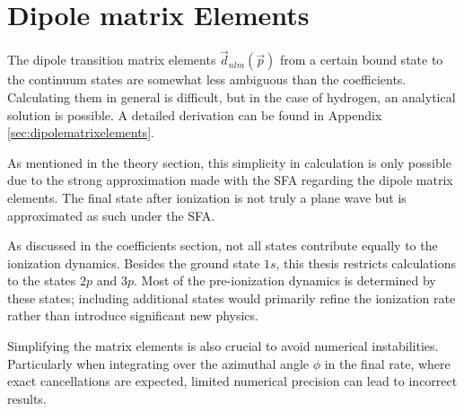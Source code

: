





\section{Dipole matrix Elements}
The dipole transition matrix elements $\vec{d}_{nlm}(\vec{p})$ from a certain bound state to the continuum states are somewhat less ambiguous than the coefficients. 
Calculating them in general is difficult, but in the case of hydrogen, an analytical solution is possible. A detailed derivation can be found in Appendix \ref{sec:dipolematrixelements}.

As mentioned in the theory section, this simplicity in calculation is only possible due to the strong approximation made with the SFA regarding the dipole matrix elements. 
The final state after ionization is not truly a plane wave but is approximated as such under the SFA.

As discussed in the coefficients section, not all states contribute equally to the ionization dynamics. 
Besides the ground state $1s$, this thesis restricts calculations to the states $2p$ and $3p$. Most of the pre-ionization dynamics is determined by these states; including additional states would primarily refine the ionization rate rather than introduce significant new physics.

Simplifying the matrix elements is also crucial to avoid numerical instabilities. 
Particularly when integrating over the azimuthal angle $\phi$ in the final rate, where exact cancellations are expected, limited numerical precision can lead to incorrect results.

